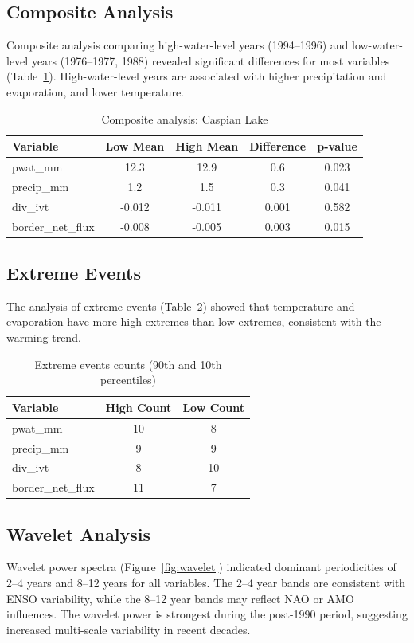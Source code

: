 \documentclass[12pt,a4paper]{article}
\begin{document}
\subsection{Composite Analysis}
Composite analysis comparing high-water-level years (1994–1996) and low-water-level years (1976–1977, 1988) revealed significant differences for most variables (Table~\ref{tab:composite}). High-water-level years are associated with higher precipitation and evaporation, and lower temperature.

\begin{table}[H]
\centering
\caption{Composite analysis: Caspian Lake}
\label{tab:composite}
\begin{tabular}{lcccc}
\toprule
\textbf{Variable} & \textbf{Low Mean} & \textbf{High Mean} & \textbf{Difference} & \textbf{p-value} \\
\midrule
pwat\_mm & 12.3 & 12.9 & 0.6 & 0.023 \\
precip\_mm & 1.2 & 1.5 & 0.3 & 0.041 \\
div\_ivt & -0.012 & -0.011 & 0.001 & 0.582 \\
border\_net\_flux & -0.008 & -0.005 & 0.003 & 0.015 \\
\bottomrule
\end{tabular}
\end{table}

\subsection{Extreme Events}
The analysis of extreme events (Table~\ref{tab:extreme}) showed that temperature and evaporation have more high extremes than low extremes, consistent with the warming trend.

\begin{table}[H]
\centering
\caption{Extreme events counts (90th and 10th percentiles)}
\label{tab:extreme}
\begin{tabular}{lcc}
\toprule
\textbf{Variable} & \textbf{High Count} & \textbf{Low Count} \\
\midrule
pwat\_mm & 10 & 8 \\
precip\_mm & 9 & 9 \\
div\_ivt & 8 & 10 \\
border\_net\_flux & 11 & 7 \\
\bottomrule
\end{tabular}
\end{table}

\subsection{Wavelet Analysis}
Wavelet power spectra (Figure~\ref{fig:wavelet}) indicated dominant periodicities of 2–4 years and 8–12 years for all variables. The 2–4 year bands are consistent with ENSO variability, while the 8–12 year bands may reflect NAO or AMO influences. The wavelet power is strongest during the post-1990 period, suggesting increased multi-scale variability in recent decades.
\end{document}
